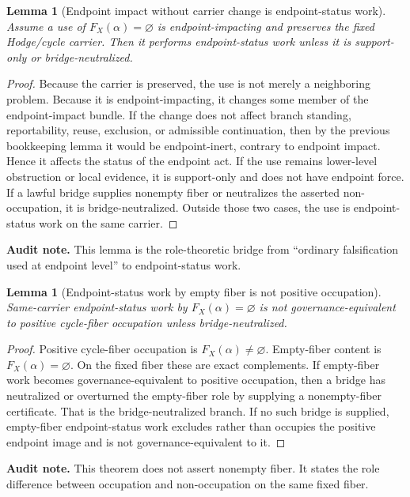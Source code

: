 \documentclass[11pt]{article}
\newtheorem{lemma}[theorem]{Lemma}
\begin{document}
\begin{lemma}[Endpoint impact without carrier change is endpoint-status work]
Assume a use of $F_X(\alpha)=\varnothing$ is endpoint-impacting and preserves the fixed Hodge/cycle carrier. Then it performs endpoint-status work unless it is support-only or bridge-neutralized.
\end{lemma}
\begin{proof}
Because the carrier is preserved, the use is not merely a neighboring problem. Because it is endpoint-impacting, it changes some member of the endpoint-impact bundle. If the change does not affect branch standing, reportability, reuse, exclusion, or admissible continuation, then by the previous bookkeeping lemma it would be endpoint-inert, contrary to endpoint impact. Hence it affects the status of the endpoint act. If the use remains lower-level obstruction or local evidence, it is support-only and does not have endpoint force. If a lawful bridge supplies nonempty fiber or neutralizes the asserted non-occupation, it is bridge-neutralized. Outside those two cases, the use is endpoint-status work on the same carrier.
\end{proof}
\par\noindent\textbf{Audit note.} This lemma is the role-theoretic bridge from ``ordinary falsification used at endpoint level'' to endpoint-status work.

\begin{lemma}[Endpoint-status work by empty fiber is not positive occupation]
Same-carrier endpoint-status work by $F_X(\alpha)=\varnothing$ is not governance-equivalent to positive cycle-fiber occupation unless bridge-neutralized.
\end{lemma}
\begin{proof}
Positive cycle-fiber occupation is $F_X(\alpha)\neq\varnothing$. Empty-fiber content is $F_X(\alpha)=\varnothing$. On the fixed fiber these are exact complements. If empty-fiber work becomes governance-equivalent to positive occupation, then a bridge has neutralized or overturned the empty-fiber role by supplying a nonempty-fiber certificate. That is the bridge-neutralized branch. If no such bridge is supplied, empty-fiber endpoint-status work excludes rather than occupies the positive endpoint image and is not governance-equivalent to it.
\end{proof}
\par\noindent\textbf{Audit note.} This theorem does not assert nonempty fiber. It states the role difference between occupation and non-occupation on the same fixed fiber.
\end{document}
